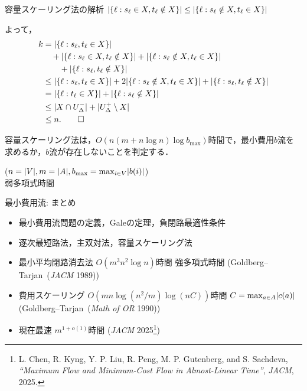 \documentclass[14pt,aspectratio=169,xcolor=dvipsnames,table,onlytextwidth,dvipdfmx]{beamer}
\begin{document}
\begin{frame}[t]{容量スケーリング法の解析}
    \small
     $\lvert\{\ell : s_\ell \in X, t_\ell \notin X\}\rvert \leq \lvert\{ \ell : s_\ell \notin X, t_\ell \in X\}\rvert$ 

    \smallskip
    よって，
    \begin{align*}
        k
        &= \lvert\{\ell : s_\ell, t_\ell \in X\}\rvert \\ 
        &\quad + \lvert\{\ell : s_\ell \in X, t_\ell \notin X\}\rvert + \lvert\{\ell : s_\ell \notin X, t_\ell \in X\}\rvert \\
        &\qquad + \lvert\{\ell : s_\ell, t_\ell \notin X\}\rvert \\
        &\leq \lvert\{\ell : s_\ell, t_\ell \in X\}\rvert + 2\lvert\{\ell : s_\ell \notin X, t_\ell \in X\}\rvert + \lvert\{\ell : s_\ell, t_\ell \notin X\}\rvert \\
        &= \lvert\{\ell: t_\ell \in X\}\rvert + \lvert\{\ell: s_\ell \notin X\}\rvert \\
        &\leq \lvert X \cap U^-_\Delta\rvert + \lvert U^+_{\Delta} \setminus X\rvert \\
        &\leq n. \qed
    \end{align*}

    \pause
    \begin{theorem}
        容量スケーリング法は，$O(n(m + n \log n) \log b_{\max})$時間で，最小費用$b$流を求めるか，$b$流が存在しないことを判定する．
    \end{theorem}
    {\footnotesize \hfill ($n = |V|, m = |A|, b_{\max} = \max_{i \in V} \lvert b(i)\rvert$)} \\
    \hfill \alert{弱多項式時間}
\end{frame}


\begin{frame}{最小費用流: まとめ}
    \small
    
    \begin{itemize}
        \item 最小費用流問題の定義，Galeの定理，負閉路最適性条件
        \item 逐次最短路法，主双対法，容量スケーリング法
    \end{itemize}

    \bigskip
    \begin{itemize}
        \item 最小平均閉路消去法 $O(m^3 n^2 \log n)$時間 \alert{強多項式時間} (Goldberg--Tarjan~(\emph{JACM} 1989))
        \item 費用スケーリング $O(mn \log(n^2/m) \log (nC))$時間  {\hfill\footnotesize $C = \max_{a \in A} \lvert c(a)\rvert$} \\
        (Goldberg--Tarjan~(\emph{Math of OR} 1990))
        \item 現在最速 $m^{1 + o(1)}$時間 (\emph{JACM} 2025\footnote{L. Chen, R. Kyng, Y. P. Liu, R. Peng, M. P. Gutenberg, and S. Sachdeva, \textit{``Maximum Flow and Minimum-Cost Flow in Almost-Linear Time''}, \textit{JACM}, 2025.})
    \end{itemize}
\end{frame}
\end{document}
